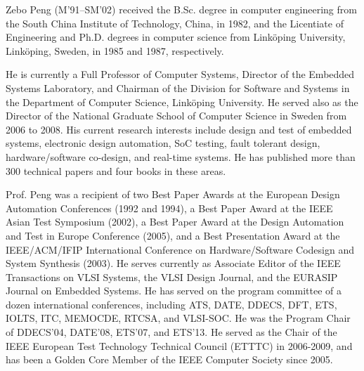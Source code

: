 \begin{IEEEbiographynophoto}{Zebo Peng}
(M'91--SM'02) received the B.Sc. degree in computer engineering from the South China Institute of Technology, China, in 1982, and the Licentiate of Engineering and Ph.D. degrees in computer science from Link\"{o}ping University, Link\"{o}ping, Sweden, in 1985 and 1987, respectively.

He is currently a Full Professor of Computer Systems, Director of the Embedded Systems Laboratory, and Chairman of the Division for Software and Systems in the Department of Computer Science, Link\"{o}ping University.
He served also as the Director of the National Graduate School of Computer Science in Sweden from 2006 to 2008.
His current research interests include design and test of embedded systems, electronic design automation, SoC testing, fault tolerant design, hardware/software co-design, and real-time systems.
He has published more than 300 technical papers and four books in these areas.

Prof. Peng was a recipient of two Best Paper Awards at the European Design Automation Conferences (1992 and 1994), a Best Paper Award at the IEEE Asian Test Symposium (2002), a Best Paper Award at the Design Automation and Test in Europe Conference (2005), and a Best Presentation Award at the IEEE/ACM/IFIP International Conference on Hardware/Software Codesign and System Synthesis (2003).
He serves currently as Associate Editor of the IEEE Transactions on VLSI Systems, the VLSI Design Journal, and the EURASIP Journal on Embedded Systems.
He has served on the program committee of a dozen international conferences, including ATS, DATE, DDECS, DFT, ETS, IOLTS, ITC, MEMOCDE, RTCSA, and VLSI-SOC.
He was the Program Chair of DDECS'04, DATE'08, ETS'07, and ETS'13.
He served as the Chair of the IEEE European Test Technology Technical Council (ETTTC) in 2006-2009, and has been a Golden Core Member of the IEEE Computer Society since 2005.
\end{IEEEbiographynophoto}
